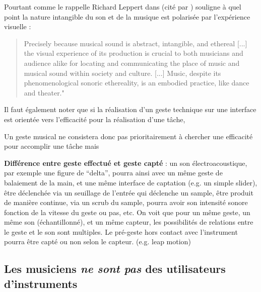 Pourtant comme le rappelle Richard Leppert dans \cite{leppert_sight_1993} (cité par \cite{iazzetta_meaning_2000}) souligne à quel point la nature intangible du son et de la musique est polarisée par l'expérience visuelle :
\begin{quotation}
Precisely because musical sound is abstract, intangible, and ethereal [...] the visual experience of its production is crucial to both musicians and audience alike for locating and communicating the place of music and musical sound within society and culture. [...] Music, despite its phenomenological sonoric ethereality, is an embodied practice, like dance and theater." 
\end{quotation}

Il faut également noter que si la réalisation d'un geste technique sur une interface est orientée vers l'efficacité pour la réalisation d'une tâche, \cite{ryan_remarks_1991}

Un geste musical ne consistera donc pas prioritairement à chercher une efficacité pour accomplir une tâche mais 



\textbf{Différence entre geste effectué et geste capté} : un son électroacoustique, par exemple une figure de ``delta'', pourra ainsi avec un même geste de balaiement de la main, et une même interface de captation (e.g. un simple slider), être déclenchée via un seuillage de l'entrée qui déclenche un sample, être produit de manière continue, via un scrub du sample, pourra avoir son intensité sonore fonction de la vitesse du geste ou pas, etc. On voit que pour un même geste, un même son (échantillonné), et un même capteur, les possibilités de relations entre le geste et le son sont multiples. Le pré-geste hors contact avec l'instrument pourra être capté ou non selon le capteur. (e.g. leap motion)



\subsection{Les musiciens \emph{ne sont pas} des utilisateurs d'instruments}

